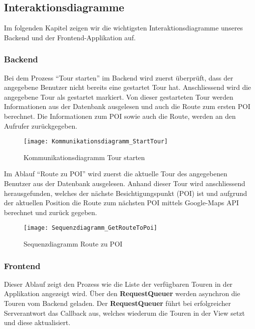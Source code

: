 \subsection{Interaktionsdiagramme}\label{interaktionsdiagramme}
Im folgenden Kapitel zeigen wir die wichtigsten Interaktionsdiagramme unseres Backend und der Frontend-Applikation auf.

\subsubsection{Backend}\label{backend}

Bei dem Prozess ``Tour starten'' im Backend wird zuerst überprüft, dass der angegebene Benutzer nicht bereits eine gestartet Tour hat. Anschliessend wird die angegebene Tour als gestartet markiert. Von dieser gestarteten Tour werden Informationen aus der Datenbank ausgelesen und auch die Route zum ersten POI berechnet. Die Informationen zum POI sowie auch die Route, werden an den Aufrufer zurückgegeben.

\begin{figure}
  \centering
  \texttt{[image: Kommunikationsdiagramm\_StartTour]}
  \caption{Kommunikationsdiagramm Tour starten}
\end{figure}

Im Ablauf ``Route zu POI'' wird zuerst die aktuelle Tour des angegebenen Benutzer aus der Datenbank ausgelesen. Anhand dieser Tour wird anschliessend herausgefunden, welches der nächste Besichtigungspunkt (POI) ist und aufgrund der aktuellen Position die Route zum nächsten
POI mittels Google-Maps API berechnet und zurück gegeben.

\begin{figure}
  \centering
  \texttt{[image: Sequenzdiagramm\_GetRouteToPoi]}
  \caption{Sequenzdiagramm Route zu POI}
\end{figure}

\subsubsection{Frontend}\label{frontend}
\label{frontend-listactivity}
Dieser Ablauf zeigt den Prozess wie die Liste der verfügbaren Touren in der Applikation
angezeigt wird. Über den \textbf{RequestQueuer} werden asynchron die Touren vom Backend geladen.
Der \textbf{RequestQueuer} führt bei erfolgreicher Serverantwort das Callback aus, welches
wiederum die Touren in der View setzt und diese aktualisiert.

